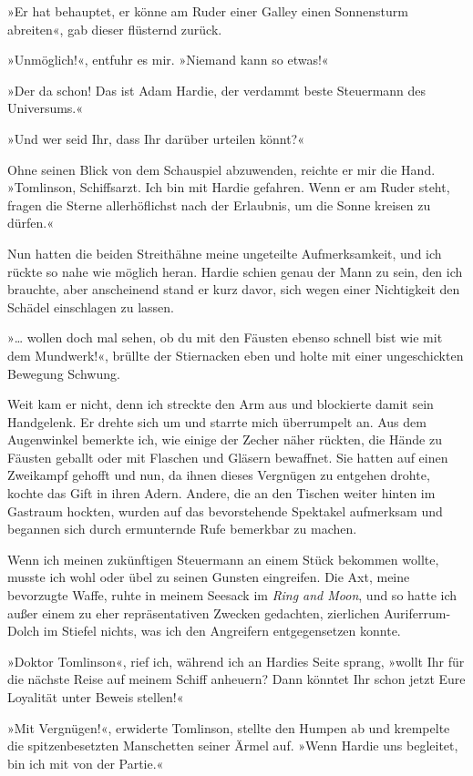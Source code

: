 »Er hat behauptet, er könne am Ruder einer Galley einen Sonnensturm
abreiten«, gab dieser flüsternd zurück.

»Unmöglich!«, entfuhr es mir. »Niemand kann so etwas!«

»Der da schon! Das ist Adam Hardie, der verdammt beste Steuermann
des Universums.«

»Und wer seid Ihr, dass Ihr darüber urteilen könnt?«

Ohne seinen Blick von dem Schauspiel abzuwenden, reichte er mir die
Hand. »Tomlinson, Schiffsarzt. Ich bin mit Hardie gefahren. Wenn er
am Ruder steht, fragen die Sterne allerhöflichst nach der
Erlaubnis, um die Sonne kreisen zu dürfen.«

\bigpar

Nun hatten die beiden Streithähne meine ungeteilte Aufmerksamkeit,
und ich rückte so nahe wie möglich heran. Hardie schien genau der
Mann zu sein, den ich brauchte, aber anscheinend stand er kurz
davor, sich wegen einer Nichtigkeit den Schädel einschlagen zu
lassen.

»\ldots{} wollen doch mal sehen, ob du mit den Fäusten ebenso schnell
bist wie mit dem Mundwerk!«, brüllte der Stiernacken eben und holte
mit einer ungeschickten Bewegung Schwung.

Weit kam er nicht, denn ich streckte den Arm aus und blockierte
damit sein Handgelenk. Er drehte sich um und starrte mich
überrumpelt an. Aus dem Augenwinkel bemerkte ich, wie einige der
Zecher näher rückten, die Hände zu Fäusten geballt oder mit
Flaschen und Gläsern bewaffnet. Sie hatten auf einen Zweikampf
gehofft und nun, da ihnen dieses Vergnügen zu entgehen drohte,
kochte das Gift in ihren Adern. Andere, die an den Tischen weiter
hinten im Gastraum hockten, wurden auf das bevorstehende Spektakel
aufmerksam und begannen sich durch ermunternde Rufe bemerkbar zu
machen.

Wenn ich meinen zukünftigen Steuermann an einem Stück bekommen
wollte, musste ich wohl oder übel zu seinen Gunsten eingreifen. Die
Axt, meine bevorzugte Waffe, ruhte in meinem Seesack im
\emph{Ring and Moon}, und so hatte ich außer einem zu eher
repräsentativen Zwecken gedachten, zierlichen Auriferrum-Dolch im
Stiefel nichts, was ich den Angreifern entgegensetzen konnte.

»Doktor Tomlinson«, rief ich, während ich an Hardies Seite sprang,
»wollt Ihr für die nächste Reise auf meinem Schiff anheuern? Dann
könntet Ihr schon jetzt Eure Loyalität unter Beweis stellen!«

»Mit Vergnügen!«, erwiderte Tomlinson, stellte den Humpen ab und
krempelte die spitzenbesetzten Manschetten seiner Ärmel auf. »Wenn
Hardie uns begleitet, bin ich mit von der Partie.«

